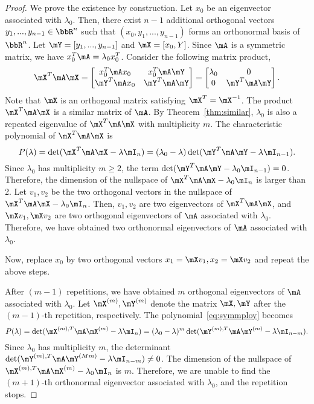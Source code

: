 \documentclass[11pt]{article}
\theoremstyle{plain}
\theoremstyle{definition}
\begin{document}
\begin{proof}
	We prove the existence by construction. Let $x_0$ be an eigenvector associated with $\lambda_0$. Then, there exist $n-1$ additional orthogonal vectors $y_1,...,y_{n-1} \in \bbR^n$ such that $(x_0, y_1,...,y_{n-1})$ forms an orthonormal basis of $\bbR^n$. Let $\mY = [y_1,...,y_{n-1}]$ and $\mX = [x_0,Y]$. Since $\mA$ is a symmetric matrix, we have $x_0^T \mA = \lambda_0 x_0^T $. Consider the following matrix product,
	\begin{align}\label{eq:symmrepeat}
		\mX^T \mA \mX =  \begin{bmatrix}
			x_0^T \mA x_0 & x_0^T \mA \mY\\
			\mY^T \mA x_0 & \mY^T \mA \mY 
		\end{bmatrix} =  \begin{bmatrix}
			\lambda_0 & 0\\
			0 & \mY^T \mA \mY 
		\end{bmatrix} .
	\end{align}
	Note that $\mX$ is an orthogonal matrix satisfying $\mX^T = \mX^{-1}$. The product $\mX^T \mA \mX$ is a similar matrix of $\mA$. By Theorem~\ref{thm:similar},  $\lambda_0$ is also a repeated eigenvalue of $\mX^T \mA \mX$ with multiplicity $m$. The characteristic  polynomial of $\mX^T \mA \mX$ is 
	\begin{equation}\label{eq:symmploy}
		P(\lambda) = \det(\mX^T \mA \mX - \lambda \mI_n) = (\lambda_0 - \lambda) \det(\mY^T \mA \mY - \lambda \mI_{n-1}). 
	\end{equation}
	Since $\lambda_0$ has multiplicity $m \geq 2$, the term $\det(\mY^T \mA \mY - \lambda_0 \mI_{n-1}) = 0$. Therefore, the dimension of the nullspace of $\mX^T \mA \mX - \lambda_0 \mI_n$ is larger than 2. Let $v_1,v_2$ be the two orthogonal vectors in the nullspace of $\mX^T \mA \mX - \lambda_0 \mI_n$. Then, $v_1, v_2$ are two eigenvectors of $\mX^T \mA \mX$, and $\mX v_1, \mX v_2$ are two orthogonal eigenvectors of $\mA$ associated with $\lambda_0$. Therefore, we have obtained two orthonormal  eigenvectors of $\mA$ associated with $\lambda_0$.
	
	\vspace{0.2cm}
	Now, replace $x_0$ by two orthogonal vectors $x_1 = \mX v_1, x_2 = \mX v_2$ and repeat the above steps.
	
	\vspace{0.2cm}
	After $(m-1)$ repetitions, we have obtained $m$ orthogonal eigenvectors of $\mA$ associated with $\lambda_0$.  Let $\mX^{(m)}, \mY^{(m)}$ denote the matrix $\mX, \mY$ after the $(m-1)$-th repetition, respectively. The polynomial~\eqref{eq:symmploy} becomes
	\[ P(\lambda) = \det(\mX^{(m),T} \mA \mX^{(m)} - \lambda \mI_n) = (\lambda_0 - \lambda)^m \det(\mY^{(m),T} \mA \mY^{(m)} - \lambda \mI_{n-m}). \]
	Since $\lambda_0$ has multiplicity $m$, the determinant $\det(\mY^{(m),T} \mA \mY^{(Mm)} - \lambda \mI_{n-m}) \neq 0$. The dimension of the nullspace of $\mX^{(m),T} \mA \mX^{(m)} - \lambda_0 \mI_n$ is $m$. Therefore, we are unable to find the $(m+1)$-th orthonormal eigenvector associated with $\lambda_0$, and the repetition stops. 
\end{proof}
\end{document}
